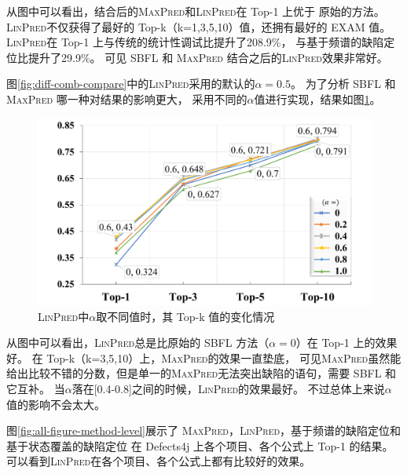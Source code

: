 从图中可以看出，结合后的\textsc{MaxPred}和\textsc{LinPred}在 Top-1 上优于
原始的方法。
\textsc{LinPred}不仅获得了最好的 Top-k（k=1,3,5,10）值，还拥有最好的 EXAM 值。
\textsc{LinPred}在 Top-1 上与传统的统计性调试比提升了208.9\%，
与基于频谱的缺陷定位比提升了29.9\%。
可见 SBFL 和 \textsc{MaxPred} 结合之后的\textsc{LinPred}效果非常好。

图\ref{fig:diff-comb-compare}中的\textsc{LinPred}采用的默认的$\alpha = 0.5$。
为了分析 SBFL 和 \textsc{MaxPred} 哪一种对结果的影响更大，
采用不同的$\alpha$值进行实现，结果如图\ref{fig:coefficient}。

\begin{figure}[htbp] 
\centering 
\includegraphics[width=12cm]{figure/coefficient} 
\caption{\textsc{LinPred}中$\alpha$取不同值时，其 Top-k 值的变化情况} 
\label{fig:coefficient}
\end{figure}

从图中可以看出，\textsc{LinPred}总是比原始的 SBFL 方法（$\alpha = 0$）在 Top-1 上的效果好。
在 Top-k（k=3,5,10）上，\textsc{MaxPred}的效果一直垫底，
可见\textsc{MaxPred}虽然能给出比较不错的分数，但是单一的\textsc{MaxPred}无法突出缺陷的语句，需要 SBFL 和它互补。
当$\alpha$落在[0.4-0.8]之间的时候，\textsc{LinPred}的效果最好。
不过总体上来说$\alpha$值的影响不会太大。

图\ref{fig:all-figure-method-level}展示了
\textsc{MaxPred}，\textsc{LinPred}，基于频谱的缺陷定位和基于状态覆盖的缺陷定位
在 Defects4j 上各个项目、各个公式上 Top-1 的结果。
可以看到\textsc{LinPred}在各个项目、各个公式上都有比较好的效果。

